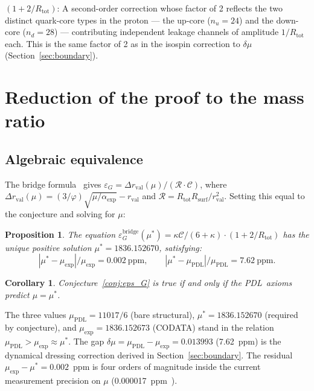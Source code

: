 \documentclass[11pt,a4paper]{article}
\newtheorem{proposition}[theorem]{Proposition}
\newtheorem{corollary}[theorem]{Corollary}
\theoremstyle{definition}
\newcommand{\PDL}{\textnormal{PDL}}
\newcommand{\Rsurf}{R_{\mathrm{surf}}}
\newcommand{\Rtot}{R_{\mathrm{tot}}}
\newcommand{\rval}{r_{\mathrm{val}}}
\newcommand{\epsg}{\varepsilon_G}
\newcommand{\calR}{\mathcal{R}}
\newcommand{\calC}{\mathcal{C}}
\newcommand{\vp}{\varphi}
\newcommand{\kap}{\kappa}
\newcommand{\drval}{\Delta r_{\mathrm{val}}}
\newcommand{\muPDL}{\mu_{\mathrm{PDL}}}
\newcommand{\muexp}{\mu_{\mathrm{exp}}}
\newcommand{\mustar}{\mu^*}
\newcommand{\dmu}{\delta\mu}
\begin{document}
\medskip\noindent\textbf{$(1+2/\Rtot)$}: A second-order correction whose factor of 2 reflects the two distinct quark-core types in the proton --- the up-core ($n_u = 24$) and the down-core ($n_d = 28$) --- contributing independent leakage channels of amplitude $1/\Rtot$ each. This is the same factor of 2 as in the isospin correction to $\dmu$ (Section~\ref{sec:boundary}).

\section{Reduction of the proof to the mass ratio}
\label{sec:reduction}

\subsection{Algebraic equivalence}
\label{subsec:equivalence}

The bridge formula~\cite{Bridge_PDL_2026} gives $\epsg = \drval(\mu)/(\calR\cdot\calC)$, where $\drval(\mu) = (3/\vp)\sqrt{\mu/\alpha_{\exp}} - \rval$ and $\calR = \Rtot\Rsurf/\rval^2$. Setting this equal to the conjecture and solving for $\mu$:

\begin{proposition}
\label{prop:mu_star}
The equation $\epsg^{\mathrm{bridge}}(\mustar) = \kap\calC/(6+\kap)\cdot(1+2/\Rtot)$ has the unique positive solution $\mustar = 1836.152670$, satisfying:
\begin{equation}
|\mustar - \muexp|/\muexp = 0.002\ \mathrm{ppm}, \qquad |\mustar - \muPDL|/\muPDL = 7.62\ \mathrm{ppm}.
\end{equation}
\end{proposition}

\begin{corollary}
Conjecture~\ref{conj:eps_G} is true if and only if the \PDL\ axioms predict $\mu = \mustar$.
\end{corollary}

The three values $\muPDL = 11017/6$ (bare structural), $\mustar = 1836.152670$ (required by conjecture), and $\muexp = 1836.152673$ (CODATA) stand in the relation $\muPDL > \muexp \approx \mustar$. The gap $\dmu = \muPDL - \muexp = 0.013993$ (7.62~ppm) is the dynamical dressing correction derived in Section~\ref{sec:boundary}. The residual $\muexp - \mustar = 0.002$~ppm is four orders of magnitude inside the current measurement precision on $\mu$ (0.000017~ppm~\cite{Alighanbari_2025}).
\end{document}
